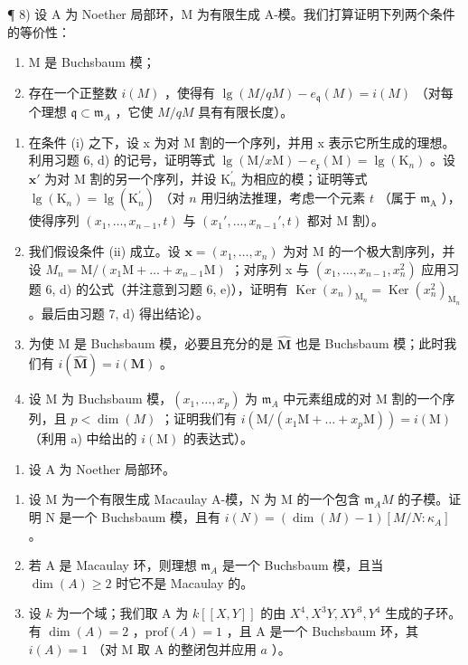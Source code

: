 ¶ 8) 设 A 为 Noether 局部环，M 为有限生成 A-模。我们打算证明下列两个条件的等价性：

\begin{enumerate}
\def\labelenumi{(\roman{enumi})}
\item
  M 是 Buchsbaum 模；
\item
  存在一个正整数 \(i(M)\) ，使得有 \(\lg(M/qM)-e_{\mathfrak{q}}(M)=i(M)\) （对每个理想 \(\mathfrak{q}\subset\mathfrak{m}_{A}\) ，它使 \(M/qM\) 具有有限长度）。
\end{enumerate}

\begin{enumerate}
\def\labelenumi{\alph{enumi})}
\item
  在条件 (i) 之下，设 x 为对 M 割的一个序列，并用 x 表示它所生成的理想。利用习题 6, d) 的记号，证明等式 \(\lg(\mathrm{M}/x\mathrm{M}) - e_{\mathfrak{x}}(\mathrm{M}) = \lg(\mathrm{K}_{n})\) 。设 \(\mathbf{x}'\) 为对 M 割的另一个序列，并设 \(\mathrm{K}_{n}^{\prime}\) 为相应的模；证明等式 \(\lg(\mathrm{K}_{n}) = \lg(\mathrm{K}_{n}^{\prime})\) （对 \(n\) 用归纳法推理，考虑一个元素 \(t\) （属于 \(\mathfrak{m}_{\mathrm{A}}\) ），使得序列 \((x_{1},\ldots,x_{n-1},t)\) 与 \((x_{1}',\ldots,x_{n-1}',t)\) 都对 M 割）。
\item
  我们假设条件 (ii) 成立。设 \(\mathbf{x} = (x_{1}, \ldots, x_{n})\) 为对 M 的一个极大割序列，并设 \(M_{n} = \mathrm{M}/(x_{1}\mathrm{M} + \ldots + x_{n-1}\mathrm{M})\) ；对序列 x 与 \((x_{1}, \ldots, x_{n-1}, x_{n}^{2})\) 应用习题 6, d) 的公式（并注意到习题 6, e)），证明有 \(\operatorname{Ker}(x_{n})_{\mathrm{M}_{n}} = \operatorname{Ker}(x_{n}^{2})_{\mathrm{M}_{n}}\) 。最后由习题 7, d) 得出结论）。
\item
  为使 M 是 Buchsbaum 模，必要且充分的是 \(\widehat{\mathbf{M}}\) 也是 Buchsbaum 模；此时我们有 \(i(\widehat{\mathbf{M}}) = i(\mathbf{M})\) 。
\item
  设 M 为 Buchsbaum 模，\((x_{1},\ldots,x_{p})\) 为 \(\mathfrak{m}_{A}\) 中元素组成的对 M 割的一个序列，且 \(p<\dim(M)\) ；证明我们有 \(i(\mathrm{M}/(x_{1}\mathrm{M}+\ldots+x_{p}\mathrm{M}))=i(\mathrm{M})\) （利用 a) 中给出的 \(i(\mathrm{M})\) 的表达式）。
\end{enumerate}

\begin{enumerate}
\def\labelenumi{\arabic{enumi})}
\setcounter{enumi}{8}
\tightlist
\item
  设 A 为 Noether 局部环。
\end{enumerate}

\begin{enumerate}
\def\labelenumi{\alph{enumi})}
\item
  设 M 为一个有限生成 Macaulay A-模，N 为 M 的一个包含 \(\mathfrak{m}_{A}M\) 的子模。证明 N 是一个 Buchsbaum 模，且有 \(i(N) = (\dim(M) - 1)[M/N : \kappa_{A}]\) 。
\item
  若 A 是 Macaulay 环，则理想 \(\mathfrak{m}_{A}\) 是一个 Buchsbaum 模，且当 \(\dim(A) \geqslant 2\) 时它不是 Macaulay 的。
\item
  设 \(k\) 为一个域；我们取 A 为 \(k[[X,Y]]\) 的由 \(X^4, X^3Y, XY^3, Y^4\) 生成的子环。有 \(\dim(A) = 2\) ，\(\text{prof}(A) = 1\) ，且 A 是一个 Buchsbaum 环，其 \(i(A) = 1\) （对 M 取 A 的整闭包并应用 \(a\) ）。
\end{enumerate}

